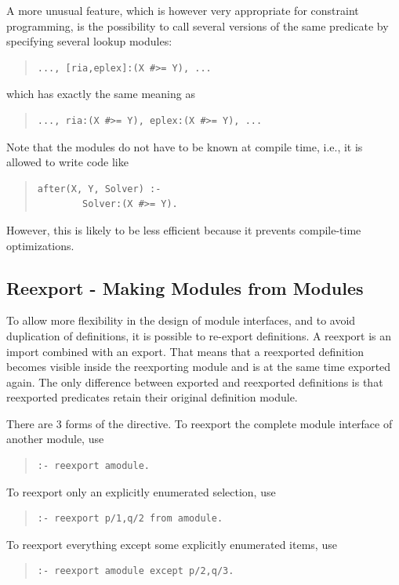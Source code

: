 A more unusual feature, which is however very appropriate for
constraint programming, is the possibility to call several versions
of the same predicate by specifying several lookup modules:
\begin{quote}
\begin{verbatim}
..., [ria,eplex]:(X #>= Y), ...
\end{verbatim}
\end{quote}
which has exactly the same meaning as
\begin{quote}
\begin{verbatim}
..., ria:(X #>= Y), eplex:(X #>= Y), ...
\end{verbatim}
\end{quote}
Note that the modules do not have to be known at compile time, i.e., it
is allowed to write code like
\begin{quote}
\begin{verbatim}
after(X, Y, Solver) :-
        Solver:(X #>= Y).
\end{verbatim}
\end{quote}
However, this is likely to be less efficient because it prevents
compile-time optimizations.


\subsection{Reexport - Making Modules from Modules}

To allow more flexibility in the design of module interfaces, and to
avoid duplication of definitions, it is possible to re-export definitions.
A reexport is an import combined with an export.
That means that a reexported definition becomes visible inside the
reexporting module and is at the same time exported again.
The only difference between exported and reexported definitions is  that
reexported predicates retain their original definition module.

There are 3 forms of the
directive. To reexport the complete
module interface of another module, use
\begin{quote}
\begin{verbatim}
:- reexport amodule.
\end{verbatim}
\end{quote}
To reexport only an explicitly enumerated selection, use
\begin{quote}
\begin{verbatim}
:- reexport p/1,q/2 from amodule.
\end{verbatim}
\end{quote}
To reexport everything except some explicitly enumerated items, use
\begin{quote}
\begin{verbatim}
:- reexport amodule except p/2,q/3.
\end{verbatim}
\end{quote}

